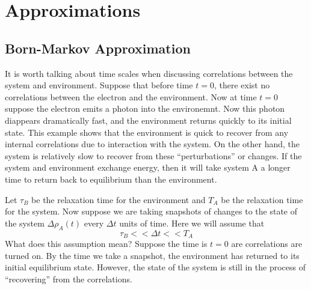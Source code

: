 \documentclass{article}
\begin{document}
\section{Approximations}
\subsection{Born-Markov Approximation}
It is worth talking about time scales when discussing correlations between
the system and environment. Suppose that before time \(t = 0\), there exist no
correlations between the electron and the environment. Now at time \(t = 0\)
suppose the electron emits a photon into the environemnt. Now this photon
diappears dramatically fast, and the environment returns quickly to its initial
state. This example shows that the environment is quick to recover from any
internal correlations due to interaction with the system. On the other hand,
the system is relatively slow to recover from these ``perturbations'' or
changes. If the system and environment exchange energy, then it will take system A
a longer time to return back to equilibrium than the environment.

Let \(\tau_B\) be the relaxation time for the environment and \(T_A\) be the
relaxation time for the system. Now suppose we are taking snapshots of changes
to the state of the system \(\Delta \rho_A(t)\) every \(\Delta t\) units of time.
Here we will assume that
\[\tau_B << \Delta t << T_A\]
What does this assumption mean? Suppose the time is \(t =0\) are correlations
are turned on. By the time we take a snapshot, the environment has returned to
its initial equilibrium state. However, the state of the system is still in the
process of ``recovering'' from the correlations.
\end{document}
